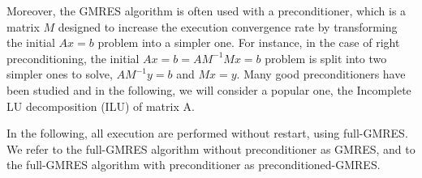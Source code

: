 \documentclass[twoside]{article}
\begin{document}




Moreover, the GMRES algorithm is often used with a preconditioner, which is a matrix $M$ designed to increase the execution convergence rate by transforming the initial $A x = b$ problem into a simpler one. For instance, in the case of right preconditioning, the initial $A x = b = A M^{-1} M x = b$ problem is split into two simpler ones to solve, $A M^{-1} y = b$ and $M x = y$. Many good preconditioners have been studied and in the following, we will consider a popular one, the Incomplete LU decomposition (ILU) of matrix A. 

In the following, all execution are performed without restart, using full-GMRES. We refer to the full-GMRES algorithm without preconditioner as GMRES, and to the full-GMRES algorithm with preconditioner as preconditioned-GMRES.
\end{document}
